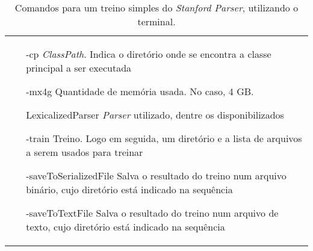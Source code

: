 \begin{table}[h!]
    \centering
    \begin{tabular}{p{}}
        \begin{itemize}
            \item [-cp] \textit{ClassPath}. Indica o diretório onde se encontra a classe principal a ser executada
            \item [-mx4g] Quantidade de memória usada. No caso, 4 GB.
            \item [LexicalizedParser] \textit{Parser} utilizado, dentre os disponibilizados
            \item [-train] Treino. Logo em seguida, um diretório e a lista de arquivos a serem usados para treinar
            \item [-saveToSerializedFile] Salva o resultado do treino num arquivo binário, cujo diretório está indicado na sequência
            \item [-saveToTextFile] Salva o resultado do treino num arquivo de texto, cujo diretório está indicado na sequência
        \end{itemize}
    \end{tabular}
    \caption[Comandos para um treino simples do \textit{Stanford Parser}]{Comandos para um treino simples do \textit{Stanford Parser}, utilizando o terminal.}
    \label{tab:tab_treino_basico_cintil}
\end{table}